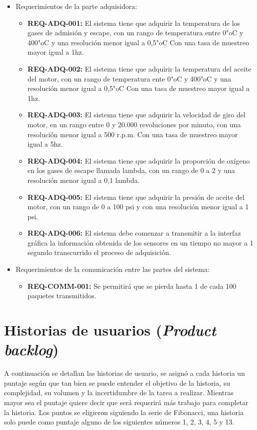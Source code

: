 \documentclass[11pt]{charter}
\begin{document}
\begin{itemize}
\begin{itemize}
	\end{itemize}
\item Requerimientos de la parte adquisidora:
	\begin{itemize}
	\item \textbf{REQ-ADQ-001:} El sistema tiene que adquirir la temperatura de los gases de admisión y escape, con un rango de temperatura entre 0"oC y 400"oC y una resolución menor igual a 0,5"oC Con una tasa de muestreo mayor igual a 1hz.
	\item \textbf{REQ-ADQ-002:} El sistema tiene que adquirir la temperatura del aceite del motor, con un rango de temperatura ente 0"oC y 400"oC y una resolución menor igual a 0,5"oC Con una tasa de muestreo mayor igual a 1hz.
	\item \textbf{REQ-ADQ-003:} El sistema tiene que adquirir la velocidad de giro del motor, en un rango entre 0 y 20.000 revoluciones por minuto, con una resolución menor igual a 500 r.p.m. Con una tasa de muestreo mayor igual a 5hz.
	\item \textbf{REQ-ADQ-004:} El sistema tiene que adquirir la proporción de oxígeno en los gases de escape llamada lambda, con un rango de 0 a 2 y una resolución menor igual a 0,1 lambda.
	\item \textbf{REQ-ADQ-005:} El sistema tiene que adquirir la presión de aceite del motor, con un rango de 0 a 100 psi y con una resolución menor igual a 1 psi.
	\item \textbf{REQ-ADQ-006:} El sistema debe comenzar a transmitir a la interfaz gráfica la información obtenida de los sensores en un tiempo no mayor a 1 segundo transcurrido el proceso de adquisición.
	
	\end{itemize}
\item Requerimientos de la comunicación entre las partes del sistema:
	\begin{itemize}
	\item \textbf{REQ-COMM-001:} Se permitirá que se pierda hasta 1 de cada 100 paquetes transmitidos.	
	\end{itemize}
\end{itemize}

\section{Historias de usuarios (\textit{Product backlog})}
\label{sec:backlog}

A continuación se detallan las historias de usuario, se asignó a cada historia un puntaje según que tan bien se puede entender el objetivo de la historia, su complejidad, su volumen y la incertidumbre de la tarea a realizar. Mientras mayor sea el puntaje quiere decir que será requerirá más trabajo para completar la historia. Los puntos se eligieron siguiendo la serie de Fibonacci, una historia solo puede como puntaje alguno de los siguientes números 1, 2, 3, 4, 5 y 13.
\end{document}
